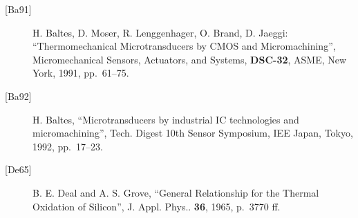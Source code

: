 \begin{description}

\item[{[Ba91]}] H. Baltes, D. Moser, R. Lenggenhager, O. Brand, D. Jaeggi: 
``Thermomechanical Microtransducers by CMOS and Micromachining'', Micromechanical Sensors, Actuators, and Systems, 
{\bf DSC-32}, ASME, New York, 1991, pp.~61--75.

\item[{[Ba92]}] H. Baltes, ``Microtransducers by industrial IC technologies and micromachining'', Tech. Digest 10th Sensor Symposium, IEE Japan, Tokyo, 1992, 
pp.~17--23.

\item[{[De65]}] B. E. Deal and A. S. Grove, ``General Relationship for the Thermal Oxidation of Silicon'', J. Appl. Phys.. {\bf 36}, 1965, 
p.~3770 ff.

\end{description}
